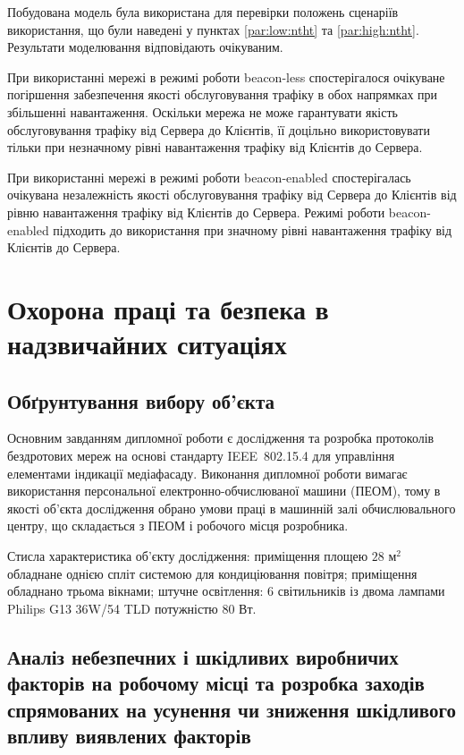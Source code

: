 \documentclass[a4paper,ukrainian,utf8,nocolumnsxix,nocolumnxxxii,nocolumnxxxi,floatsection,equationsection]{eskdtext}
\newcommand{\iee}[0]{IEEE~802.15.4\xspace}
\newcommand{\blm}[0]{beacon-less\xspace}
\newcommand{\bem}[0]{beacon-enabled\xspace}
\begin{document}
Побудована модель була використана для перевірки положень сценаріїв використання, що були наведені у пунктах \ref{par:low:ntht} та \ref{par:high:ntht}. Результати моделювання відповідають очікуваним.

При використанні мережі в режимі роботи \blm спостерігалося очікуване погіршення забезпечення якості обслуговування трафіку в обох напрямках при збільшенні навантаження. Оскільки мережа не може гарантувати якість обслуговування трафіку від Сервера до Клієнтів, її доцільно використовувати тільки при незначному рівні навантаження трафіку від Клієнтів до Сервера.

При використанні мережі в режимі роботи \bem спостерігалась очікувана незалежність якості обслуговування трафіку від Сервера до Клієнтів від  рівню навантаження трафіку від Клієнтів до Сервера. Режимі роботи \bem підходить до використання при значному рівні навантаження трафіку від Клієнтів до Сервера.

\section{Охорона праці та безпека в надзвичайних ситуаціях}
\label{sec:work_safety}

\subsection{Обґрунтування вибору об'єкта}

Основним завданням дипломної роботи є дослідження та розробка протоколів бездротових мереж на основі стандарту \iee для управління елементами індикації медіафасаду. Виконання дипломної роботи вимагає використання персональної електронно-обчислюваної машини (ПЕОМ), тому в якості об'єкта дослідження обрано умови праці в машинній залі обчислювального центру, що складається з ПЕОМ і робочого місця розробника.

Стисла характеристика об'єкту дослідження: приміщення площею $28 \text{ м}^2$ обладнане однією спліт системою для кондиціювання повітря; приміщення обладнано трьома вікнами; штучне освітлення: 6 світильників із двома лампами Philips G13 36W/54 TLD потужністю 80 Вт.


\subsection{Аналіз небезпечних і шкідливих виробничих факторів на робочому місці та розробка заходів спрямованих на усунення чи зниження шкідливого впливу виявлених факторів}
\end{document}
